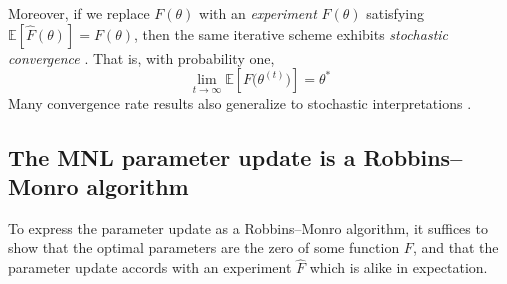 \documentclass[preprint,12pt,authoryear]{elsarticle}
\begin{document}
Moreover, if we replace $F(\theta)$ with an \emph{experiment} $\hat F(\theta)$ satisfying $\mathbb{E}\left[\hat F(\theta)\right] = F(\theta)$, then the same iterative scheme exhibits \emph{stochastic convergence} \cite[][]{robbinsmonro1951, tsitsiklis1994}. That is, with probability one,
\[\lim_{t\to \infty} \mathbb{E}\left[F\bigl(\theta^{(t)}\bigr)\right] = \theta^*\]
Many convergence rate results also generalize to stochastic interpretations \cite[][\S10.4]{kushner1997}.


\subsection{The MNL parameter update is a Robbins--Monro algorithm}
To express the parameter update as a Robbins--Monro algorithm, it suffices to show that the optimal parameters are the zero of some function $F$, and that the parameter update accords with an experiment $\hat F$ which is alike in expectation.  
\end{document}
